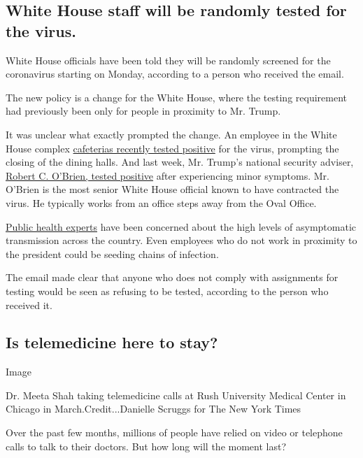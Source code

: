 \hypertarget{white-house-staff-will-be-randomly-tested-for-the-virus}{%
\subsection{White House staff will be randomly tested for the
virus.}\label{white-house-staff-will-be-randomly-tested-for-the-virus}}

White House officials have been told they will be randomly screened for
the coronavirus starting on Monday, according to a person who received
the email.

The new policy is a change for the White House, where the testing
requirement had previously been only for people in proximity to Mr.
Trump.

It was unclear what exactly prompted the change. An employee in the
White House complex
\href{https://www.nytimes.com/2020/07/22/us/politics/white-house-employee-covid-19.html}{cafeterias
recently tested positive} for the virus, prompting the closing of the
dining halls. And last week, Mr. Trump's national security adviser,
\href{https://www.nytimes.com/2020/07/27/us/politics/robert-obrien-virus.html}{Robert
C. O'Brien, tested positive} after experiencing minor symptoms. Mr.
O'Brien is the most senior White House official known to have contracted
the virus. He typically works from an office steps away from the Oval
Office.

\href{https://www.nytimes.com/2020/08/02/health/dr-birx-coronavirus-phase.html}{Public
health experts} have been concerned about the high levels of
asymptomatic transmission across the country. Even employees who do not
work in proximity to the president could be seeding chains of infection.

The email made clear that anyone who does not comply with assignments
for testing would be seen as refusing to be tested, according to the
person who received it.

\hypertarget{is-telemedicine-here-to-stay}{%
\subsection{Is telemedicine here to
stay?}\label{is-telemedicine-here-to-stay}}

Image

Dr. Meeta Shah taking telemedicine calls at Rush University Medical
Center in Chicago in March.Credit...Danielle Scruggs for The New York
Times

Over the past few months, millions of people have relied on video or
telephone calls to talk to their doctors. But how long will the moment
last?


